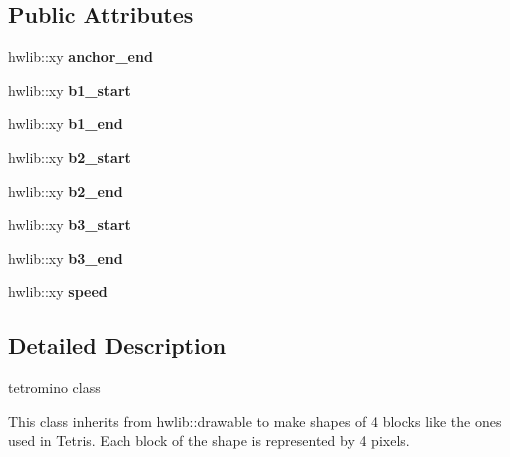 \subsection*{Public Attributes}
\begin{DoxyCompactItemize}
\item 
\mbox{\label{classtetris_1_1Tetromino_ab896704417efe22a953237630682842c}} 
hwlib\+::xy {\bfseries anchor\+\_\+end}
\item 
\mbox{\label{classtetris_1_1Tetromino_a0aa79d0712026a63e4c13a7319062f1a}} 
hwlib\+::xy {\bfseries b1\+\_\+start}
\item 
\mbox{\label{classtetris_1_1Tetromino_af406624050337a1d015130d8fa62c247}} 
hwlib\+::xy {\bfseries b1\+\_\+end}
\item 
\mbox{\label{classtetris_1_1Tetromino_aa4cb19767c4ac9dd706065eda1745df9}} 
hwlib\+::xy {\bfseries b2\+\_\+start}
\item 
\mbox{\label{classtetris_1_1Tetromino_a56213f0aba5003fdfda3b93c9e5cc9d6}} 
hwlib\+::xy {\bfseries b2\+\_\+end}
\item 
\mbox{\label{classtetris_1_1Tetromino_a2d9a1fe579c7640462285630ef828cf6}} 
hwlib\+::xy {\bfseries b3\+\_\+start}
\item 
\mbox{\label{classtetris_1_1Tetromino_a4042358d9b06c3472c21be7d1131f178}} 
hwlib\+::xy {\bfseries b3\+\_\+end}
\item 
\mbox{\label{classtetris_1_1Tetromino_ab19195a914cecc3f58ee748976431bd1}} 
hwlib\+::xy {\bfseries speed}
\end{DoxyCompactItemize}


\subsection{Detailed Description}
tetromino class 

This class inherits from hwlib\+::drawable to make shapes of 4 blocks like the ones used in Tetris. Each block of the shape is represented by 4 pixels. 

